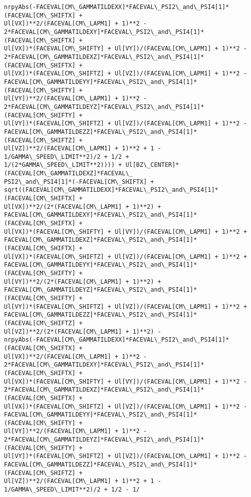 \documentclass[landscape,letterpaper,10pt,english]{article}
\begin{document}
\begin{Verbatim}[commandchars=\\\{\}]
nrpyAbs(-FACEVAL[CM\_GAMMATILDEXX]*FACEVAL\_PSI2\_and\_PSI4[1]*(FACEVAL[CM\_SHIFTX] +
Ul[VX])**2/(FACEVAL[CM\_LAPM1] + 1)**2 -
2*FACEVAL[CM\_GAMMATILDEXY]*FACEVAL\_PSI2\_and\_PSI4[1]*(FACEVAL[CM\_SHIFTX] +
Ul[VX])*(FACEVAL[CM\_SHIFTY] + Ul[VY])/(FACEVAL[CM\_LAPM1] + 1)**2 -
2*FACEVAL[CM\_GAMMATILDEXZ]*FACEVAL\_PSI2\_and\_PSI4[1]*(FACEVAL[CM\_SHIFTX] +
Ul[VX])*(FACEVAL[CM\_SHIFTZ] + Ul[VZ])/(FACEVAL[CM\_LAPM1] + 1)**2 -
FACEVAL[CM\_GAMMATILDEYY]*FACEVAL\_PSI2\_and\_PSI4[1]*(FACEVAL[CM\_SHIFTY] +
Ul[VY])**2/(FACEVAL[CM\_LAPM1] + 1)**2 -
2*FACEVAL[CM\_GAMMATILDEYZ]*FACEVAL\_PSI2\_and\_PSI4[1]*(FACEVAL[CM\_SHIFTY] +
Ul[VY])*(FACEVAL[CM\_SHIFTZ] + Ul[VZ])/(FACEVAL[CM\_LAPM1] + 1)**2 -
FACEVAL[CM\_GAMMATILDEZZ]*FACEVAL\_PSI2\_and\_PSI4[1]*(FACEVAL[CM\_SHIFTZ] +
Ul[VZ])**2/(FACEVAL[CM\_LAPM1] + 1)**2 + 1 - 1/GAMMA\_SPEED\_LIMIT**2)/2 + 1/2 +
1/(2*GAMMA\_SPEED\_LIMIT**2)))) + Ul[BZ\_CENTER]*(FACEVAL[CM\_GAMMATILDEXZ]*FACEVAL\_
PSI2\_and\_PSI4[1]*(-FACEVAL[CM\_SHIFTX] +
sqrt((FACEVAL[CM\_GAMMATILDEXX]*FACEVAL\_PSI2\_and\_PSI4[1]*(FACEVAL[CM\_SHIFTX] +
Ul[VX])**2/(2*(FACEVAL[CM\_LAPM1] + 1)**2) +
FACEVAL[CM\_GAMMATILDEXY]*FACEVAL\_PSI2\_and\_PSI4[1]*(FACEVAL[CM\_SHIFTX] +
Ul[VX])*(FACEVAL[CM\_SHIFTY] + Ul[VY])/(FACEVAL[CM\_LAPM1] + 1)**2 +
FACEVAL[CM\_GAMMATILDEXZ]*FACEVAL\_PSI2\_and\_PSI4[1]*(FACEVAL[CM\_SHIFTX] +
Ul[VX])*(FACEVAL[CM\_SHIFTZ] + Ul[VZ])/(FACEVAL[CM\_LAPM1] + 1)**2 +
FACEVAL[CM\_GAMMATILDEYY]*FACEVAL\_PSI2\_and\_PSI4[1]*(FACEVAL[CM\_SHIFTY] +
Ul[VY])**2/(2*(FACEVAL[CM\_LAPM1] + 1)**2) +
FACEVAL[CM\_GAMMATILDEYZ]*FACEVAL\_PSI2\_and\_PSI4[1]*(FACEVAL[CM\_SHIFTY] +
Ul[VY])*(FACEVAL[CM\_SHIFTZ] + Ul[VZ])/(FACEVAL[CM\_LAPM1] + 1)**2 +
FACEVAL[CM\_GAMMATILDEZZ]*FACEVAL\_PSI2\_and\_PSI4[1]*(FACEVAL[CM\_SHIFTZ] +
Ul[VZ])**2/(2*(FACEVAL[CM\_LAPM1] + 1)**2) -
nrpyAbs(-FACEVAL[CM\_GAMMATILDEXX]*FACEVAL\_PSI2\_and\_PSI4[1]*(FACEVAL[CM\_SHIFTX] +
Ul[VX])**2/(FACEVAL[CM\_LAPM1] + 1)**2 -
2*FACEVAL[CM\_GAMMATILDEXY]*FACEVAL\_PSI2\_and\_PSI4[1]*(FACEVAL[CM\_SHIFTX] +
Ul[VX])*(FACEVAL[CM\_SHIFTY] + Ul[VY])/(FACEVAL[CM\_LAPM1] + 1)**2 -
2*FACEVAL[CM\_GAMMATILDEXZ]*FACEVAL\_PSI2\_and\_PSI4[1]*(FACEVAL[CM\_SHIFTX] +
Ul[VX])*(FACEVAL[CM\_SHIFTZ] + Ul[VZ])/(FACEVAL[CM\_LAPM1] + 1)**2 -
FACEVAL[CM\_GAMMATILDEYY]*FACEVAL\_PSI2\_and\_PSI4[1]*(FACEVAL[CM\_SHIFTY] +
Ul[VY])**2/(FACEVAL[CM\_LAPM1] + 1)**2 -
2*FACEVAL[CM\_GAMMATILDEYZ]*FACEVAL\_PSI2\_and\_PSI4[1]*(FACEVAL[CM\_SHIFTY] +
Ul[VY])*(FACEVAL[CM\_SHIFTZ] + Ul[VZ])/(FACEVAL[CM\_LAPM1] + 1)**2 -
FACEVAL[CM\_GAMMATILDEZZ]*FACEVAL\_PSI2\_and\_PSI4[1]*(FACEVAL[CM\_SHIFTZ] +
Ul[VZ])**2/(FACEVAL[CM\_LAPM1] + 1)**2 + 1 - 1/GAMMA\_SPEED\_LIMIT**2)/2 + 1/2 - 1/

\end{Verbatim}
\end{document}
